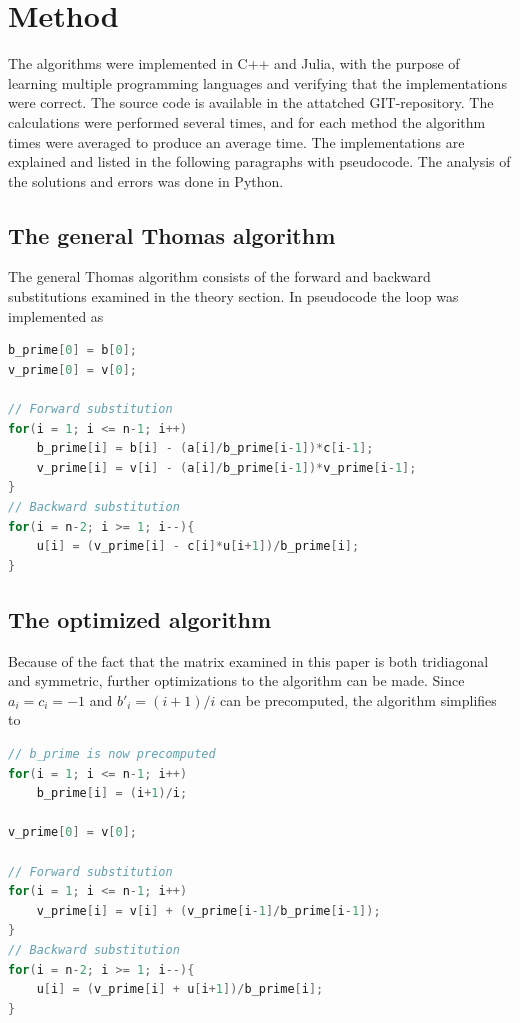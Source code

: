 \documentclass[aps,prl,reprint,toc]{revtex4-1}
\begin{document}
\section{Method}
The algorithms were implemented in C++ and Julia, with the purpose of
learning multiple programming languages and verifying that the implementations were correct.
The source code is available in the attatched GIT-repository. The calculations
were performed several times, and for each method the algorithm times were averaged to produce an
average time. The implementations are explained and listed in the following paragraphs with pseudocode.
The analysis of the solutions and errors was done in Python.

\subsection{The general Thomas algorithm}
The general Thomas algorithm consists of the forward and backward substitutions
examined in the theory section. In pseudocode the loop was implemented as
\begin{lstlisting}[language=cpp, caption={Thomas algorithm implementation for a general tridiagonal matrix}]
b_prime[0] = b[0];
v_prime[0] = v[0];

// Forward substitution
for(i = 1; i <= n-1; i++)
    b_prime[i] = b[i] - (a[i]/b_prime[i-1])*c[i-1];
    v_prime[i] = v[i] - (a[i]/b_prime[i-1])*v_prime[i-1];
}
// Backward substitution
for(i = n-2; i >= 1; i--){
    u[i] = (v_prime[i] - c[i]*u[i+1])/b_prime[i];
}
\end{lstlisting}
\subsection{The optimized algorithm}
Because of the fact that the matrix examined in this paper is both tridiagonal and
symmetric, further optimizations to the algorithm can be made. Since $a_i = c_i = -1$
and $b'_i = (i+1)/i$ can be precomputed, the algorithm simplifies to
\begin{lstlisting}[language=cpp, caption={Optimized version of Thomas algorithm for a symmetric tridiagonal matrix}]
// b_prime is now precomputed
for(i = 1; i <= n-1; i++)
    b_prime[i] = (i+1)/i;

v_prime[0] = v[0];

// Forward substitution
for(i = 1; i <= n-1; i++)
    v_prime[i] = v[i] + (v_prime[i-1]/b_prime[i-1]);
}
// Backward substitution
for(i = n-2; i >= 1; i--){
    u[i] = (v_prime[i] + u[i+1])/b_prime[i];
}
\end{lstlisting}
\end{document}
